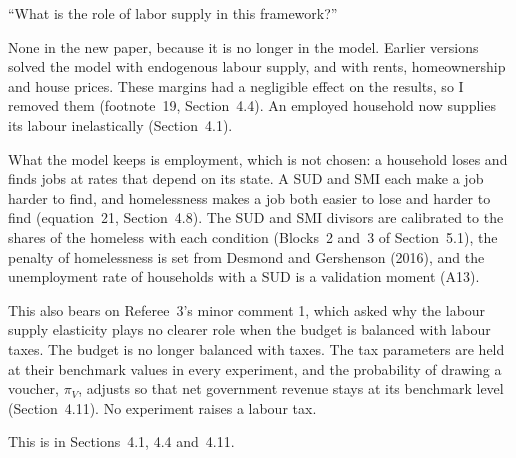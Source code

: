 \documentclass[11pt]{article}
\begin{document}
\begin{referee}
``What is the role of labor supply in this framework?''
\end{referee}
\begin{response}
\concede None in the new paper, because it is no longer in the model. Earlier
versions solved the model with endogenous labour supply, and with rents,
homeownership and house prices. These margins had a negligible effect on the
results, so I removed them (footnote~19, Section~4.4). An employed household now
supplies its labour inelastically (Section~4.1).

What the model keeps is employment, which is not chosen: a household loses and
finds jobs at rates that depend on its state. A SUD and SMI each make a job harder
to find, and homelessness makes a job both easier to lose and harder to find
(equation~21, Section~4.8). The SUD and SMI divisors are calibrated to the shares of
the homeless with each condition (Blocks~2 and~3 of Section~5.1), the penalty of
homelessness is set from Desmond and Gershenson (2016), and the unemployment rate of
households with a SUD is a validation moment (A13).

This also bears on Referee~3's minor comment 1, which asked why the labour supply
elasticity plays no clearer role when the budget is balanced with labour taxes. The
budget is no longer balanced with taxes. The tax parameters are held at their
benchmark values in every experiment, and the probability of drawing a voucher,
$\pi_V$, adjusts so that net government revenue stays at its benchmark level
(Section~4.11). No experiment raises a labour tax.

This is in Sections~4.1, 4.4 and~4.11.
\end{response}
\end{document}
